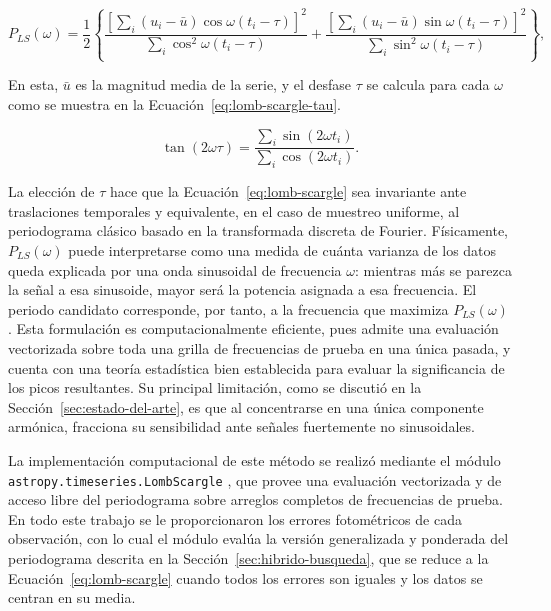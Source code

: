 \documentclass[12pt,letterpaper,oneside]{book}
\begin{document}
\begin{equation}
	P_{LS}(\omega) = \frac{1}{2}\left\{
	\frac{\left[\sum_i (u_i - \bar u)\cos\omega(t_i - \tau)\right]^2}{\sum_i \cos^2\omega(t_i - \tau)}
	+
	\frac{\left[\sum_i (u_i - \bar u)\sin\omega(t_i - \tau)\right]^2}{\sum_i \sin^2\omega(t_i - \tau)}
	\right\},
	\label{eq:lomb-scargle}
\end{equation}

En esta, $\bar u$ es la magnitud media de la serie, y el desfase $\tau$ se calcula para cada $\omega$ como se muestra en la Ecuaci\'on~\eqref{eq:lomb-scargle-tau}.

\begin{equation}
	\tan(2\omega\tau) = \frac{\sum_i \sin(2\omega t_i)}{\sum_i \cos(2\omega t_i)}.
	\label{eq:lomb-scargle-tau}
\end{equation}

La elecci\'on de $\tau$ hace que la Ecuaci\'on~\eqref{eq:lomb-scargle} sea invariante ante traslaciones temporales y equivalente, en el caso de muestreo uniforme, al periodograma cl\'asico basado en la transformada discreta de Fourier. F\'isicamente, $P_{LS}(\omega)$ puede interpretarse como una medida de cu\'anta varianza de los datos queda explicada por una onda sinusoidal de frecuencia $\omega$: mientras m\'as se parezca la se\~nal a esa sinusoide, mayor ser\'a la potencia asignada a esa frecuencia. El periodo candidato corresponde, por tanto, a la frecuencia que maximiza $P_{LS}(\omega)$. Esta formulaci\'on es computacionalmente eficiente, pues admite una evaluaci\'on vectorizada sobre toda una grilla de frecuencias de prueba en una \'unica pasada, y cuenta con una teor\'ia estad\'istica bien establecida para evaluar la significancia de los picos resultantes. Su principal limitaci\'on, como se discuti\'o en la Secci\'on~\ref{sec:estado-del-arte}, es que al concentrarse en una \'unica componente arm\'onica, fracciona su sensibilidad ante se\~nales fuertemente no sinusoidales.

La implementaci\'on computacional de este m\'etodo se realiz\'o mediante el m\'odulo \texttt{astropy.\allowbreak timeseries.\allowbreak LombScargle} \citep{astropy}, que provee una evaluaci\'on vectorizada y de acceso libre del periodograma sobre arreglos completos de frecuencias de prueba. En todo este trabajo se le proporcionaron los errores fotom\'etricos de cada observaci\'on, con lo cual el m\'odulo eval\'ua la versi\'on generalizada y ponderada del periodograma descrita en la Secci\'on~\ref{sec:hibrido-busqueda}, que se reduce a la Ecuaci\'on~\eqref{eq:lomb-scargle} cuando todos los errores son iguales y los datos se centran en su media.
\end{document}
